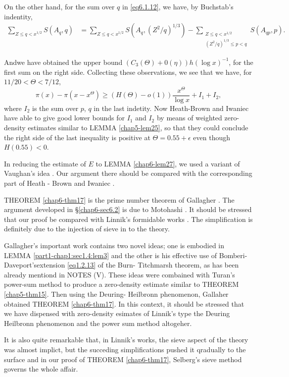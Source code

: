 On the other hand, for the sum over $q$ in \eqref{eq6.1.12}, we have, by
Buchstab's indentity,  
\begin{align*}
\sum_{Z \le q < x^{1/2}} S(A_q,q) &= \sum_{Z \le q < x ^{1/2}} S(A_q, (Z^2/q)^{1/3}) 
  - \sum_{\substack {Z \le q < x^{1/2} \\ (Z^2 / q )^{1/3} \le p < q}} S(A_{qp},p).
\end{align*}

And\pageoriginale we have obtained the upper bound $(C_3(\Theta) + 0
(\eta))h (\log 
x)^{-1}$, for the first sum on the right side. Collecting these
observations, we see that we have, for $11/20 < \Theta< 7/12$, 
$$
\pi (x) - \pi (x-x^\Theta) \ge (H(\Theta) - o(1)) \frac{x
  ^\Theta}{\log x}+ I_1 + I_2, 
$$
where $I_2$ is the sum over $p$, $q$ in the last indetity. Now
Heath-Brown and Iwaniec have able to give good lower bounds for $I_1$
and $I_2$ by means of weighted zero-density estimates similar to LEMMA
\ref{chap5-lem25}, so that they could conclude the right side of the last
inequality is positive at $\Theta= 0.55 + \epsilon $ even though
$H(0.55) < 0$.  

In reducing the estimate of $E$ to LEMMA \ref{chap6-lem27}, we used a
variant of Vaughan's idea \cite{key81}. Our argument there should be
compared with the 
corresponding part of Heath - Brown and Iwaniec \cite{key22}. 

THEOREM \ref{chap6-thm17} is the prime number theorem of Gallagher
\cite{key15}. The argument developed in \S \ref{chap6-sec6.2} is due
to Motohashi \cite{key58}. It should 
be stressed that our proof be compared with Linnik's formidable works
\cite{key47}. The simplification is definitely due to the injection of sieve
in to the theory. 

Gallagher's important work \cite{key15} contains two novel ideas; one is
embodied in LEMMA \ref{part1-chap1:sec1.4:lem3} and the other is his
effective use of 
Bomberi-Daveport's\pageoriginale extension \eqref{eq1.2.13} of the Burn-
Titchmarsh theorem, as has 
been already mentiond in NOTES (V). These ideas were combained with
Turan's power-sum method to produce a zero-density estimate similar
to THEOREM \ref{chap5-thm15}. 
Then using the Deuring- Heilbronn phenomenon, Gallaher
obtained THEOREM \ref{chap6-thm17}. In this context, it should be
stressed that we 
have dispensed with zero-density esimates of Linnik's type the Deuring
Heilbronn phenomenon and the power sum method altogeher. 

It is also quite remarkable that, in Linnik's works, the sieve aspect
of the theory was almost implict, but the succeding simplifications
pushed it qradually to the surface and in our proof of THEOREM
\ref{chap6-thm17}, 
Selberg's sieve method governs the whole affair. 

